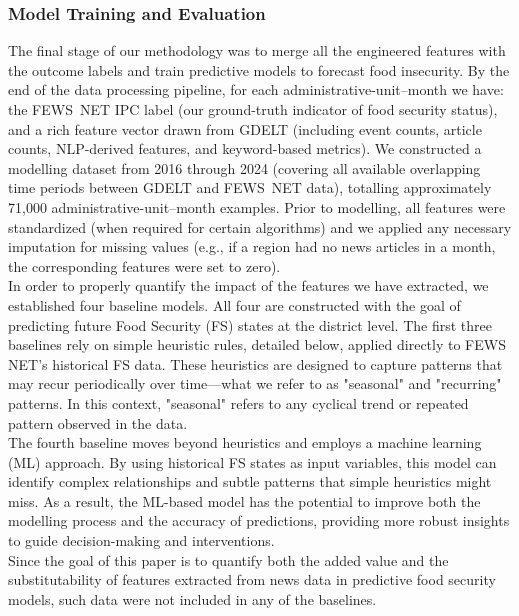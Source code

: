 \documentclass{article}
\begin{document}
\subsubsection{Model Training and Evaluation}
The final stage of our methodology was to merge all the engineered features with the outcome labels and train predictive models to forecast food insecurity. By the end of the data processing pipeline, for each administrative-unit–month we have: the FEWS~NET IPC label (our ground-truth indicator of food security status), and a rich feature vector drawn from GDELT (including event counts, article counts, NLP-derived features, and keyword-based metrics). We constructed a modelling dataset from 2016 through 2024 (covering all available overlapping time periods between GDELT and FEWS~NET data), totalling approximately 71{,}000 administrative-unit–month examples. Prior to modelling, all features were standardized (when required for certain algorithms) and we applied any necessary imputation for missing values (e.g., if a region had no news articles in a month, the corresponding features were set to zero).\\

In order to properly quantify the impact of the features we have extracted, we established four baseline models. All four are constructed with the goal of predicting future Food Security (FS) states at the district level. The first three baselines rely on simple heuristic rules, detailed below, applied directly to FEWS NET's historical FS data. These heuristics are designed to capture patterns that may recur periodically over time—what we refer to as "seasonal" and "recurring" patterns. In this context, "seasonal" refers to any cyclical trend or repeated pattern observed in the data. \\

The fourth baseline moves beyond heuristics and employs a machine learning (ML) approach. By using historical FS states as input variables, this model can identify complex relationships and subtle patterns that simple heuristics might miss. As a result, the ML-based model has the potential to improve both the modelling process and the accuracy of predictions, providing more robust insights to guide decision-making and interventions. \\

Since the goal of this paper is to quantify both the added value and the substitutability of features extracted from news data in predictive food security models, such data were not included in any of the baselines.
\end{document}
